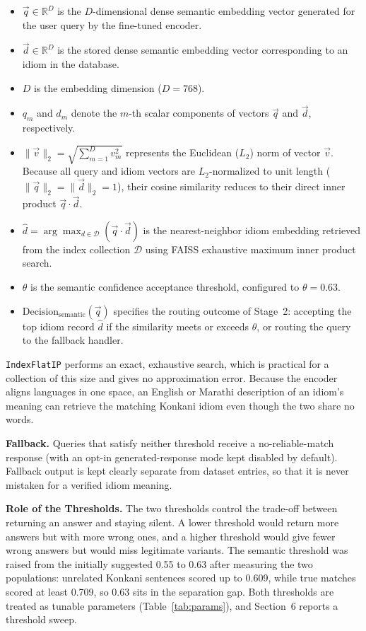 \documentclass[12pt,a4paper]{article}
\begin{document}
\begin{itemize}
  \item $\vec{q} \in \mathbb{R}^D$ is the $D$-dimensional dense semantic embedding vector generated for the user query by the fine-tuned encoder.
  \item $\vec{d} \in \mathbb{R}^D$ is the stored dense semantic embedding vector corresponding to an idiom in the database.
  \item $D$ is the embedding dimension ($D = 768$).
  \item $q_m$ and $d_m$ denote the $m$-th scalar components of vectors $\vec{q}$ and $\vec{d}$, respectively.
  \item $\|\vec{v}\|_2 = \sqrt{\sum_{m=1}^{D} v_m^2}$ represents the Euclidean ($L_2$) norm of vector $\vec{v}$. Because all query and idiom vectors are $L_2$-normalized to unit length ($\|\vec{q}\|_2 = \|\vec{d}\|_2 = 1$), their cosine similarity reduces to their direct inner product $\vec{q} \cdot \vec{d}$.
  \item $\hat{d} = \arg\max_{d \in \mathcal{D}} (\vec{q} \cdot \vec{d})$ is the nearest-neighbor idiom embedding retrieved from the index collection $\mathcal{D}$ using FAISS exhaustive maximum inner product search.
  \item $\theta$ is the semantic confidence acceptance threshold, configured to $\theta = 0.63$.
  \item $\mathrm{Decision}_{\mathrm{semantic}}(\vec{q})$ specifies the routing outcome of Stage~2: accepting the top idiom record $\hat{d}$ if the similarity meets or exceeds $\theta$, or routing the query to the fallback handler.
\end{itemize}
\texttt{IndexFlatIP} performs an exact, exhaustive search, which is practical for a collection of this size and gives no approximation error. Because the encoder aligns languages in one space, an English or Marathi description of an idiom's meaning can retrieve the matching Konkani idiom even though the two share no words.

\textbf{Fallback.} Queries that satisfy neither threshold receive a no-reliable-match response (with an opt-in generated-response mode kept disabled by default). Fallback output is kept clearly separate from dataset entries, so that it is never mistaken for a verified idiom meaning.

\textbf{Role of the Thresholds.} The two thresholds control the trade-off between returning an answer and staying silent. A lower threshold would return more answers but with more wrong ones, and a higher threshold would give fewer wrong answers but would miss legitimate variants. The semantic threshold was raised from the initially suggested 0.55 to 0.63 after measuring the two populations: unrelated Konkani sentences scored up to 0.609, while true matches scored at least 0.709, so 0.63 sits in the separation gap. Both thresholds are treated as tunable parameters (Table~\ref{tab:params}), and Section~6 reports a threshold sweep.
\end{document}
